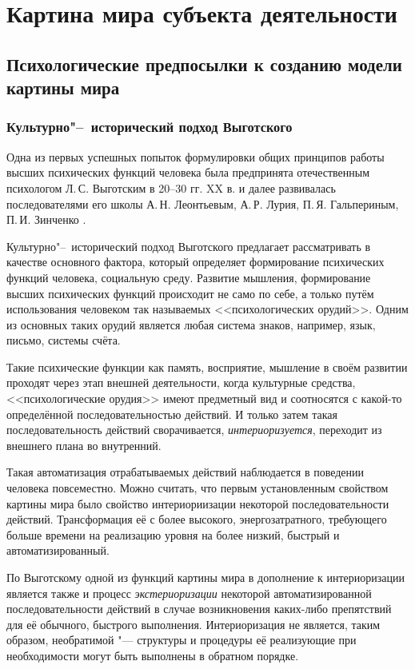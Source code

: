 \chapter{Картина мира субъекта деятельности} \label{chapt:review}

\section{Психологические предпосылки к созданию модели картины мира} \label{sect:psycho}

\subsection{Культурно"--~исторический подход Выготского}

Одна из первых успешных попыток формулировки общих принципов работы высших психических функций человека была предпринята отечественным психологом Л.\,С. Выготским в 20--30 гг. XX в. \cite{Vygotsky2005} и далее развивалась последователями его школы А.\,Н. Леонтьевым, А.\,Р. Лурия, П.\,Я. Гальпериным, П.\,И. Зинченко \cite{Zinchenko1959,Luria1963,Luria1970}. 

Культурно"--~исторический подход Выготского предлагает рассматривать в качестве основного фактора, который определяет формирование психических функций человека, социальную среду. Развитие мышления, формирование высших психических функций происходит не само по себе, а только путём использования человеком так называемых <<психологических орудий>>. Одним из основных таких орудий является любая система знаков, например, язык, письмо, системы счёта.

Такие психические функции как память, восприятие, мышление в своём развитии проходят через этап внешней деятельности, когда культурные средства, <<психологические орудия>> имеют предметный вид и соотносятся с какой-то определённой последовательностью действий. И только затем такая последовательность действий сворачивается, \textit{интериоризуется}, переходит из внешнего плана во внутренний. 

Такая автоматизация отрабатываемых действий наблюдается в поведении человека повсеместно. Можно считать, что первым установленным свойством картины мира было свойство интериориизации некоторой последовательности действий. Трансформация её с более высокого, энергозатратного, требующего больше времени на реализацию уровня на более низкий, быстрый и автоматизированный.

По Выготскому одной из функций картины мира в дополнение к интериоризации является также и процесс \textit{экстериоризации} некоторой автоматизированной последовательности действий в случае возникновения каких-либо препятствий для её обычного, быстрого выполнения. Интериоризация не является, таким образом, необратимой "--- структуры и процедуры её реализующие при необходимости могут быть выполнены в обратном порядке.


